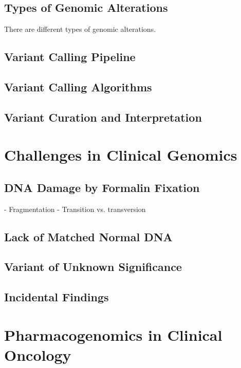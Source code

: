 \subsection{Types of Genomic Alterations}
There are different types of genomic alterations.

\subsection{Variant Calling Pipeline}

\subsection{Variant Calling Algorithms}

\subsection{Variant Curation and Interpretation}

\section{Challenges in Clinical Genomics}
\label{sec:ChallengesinClinicalGenomics}

\subsection{DNA Damage by Formalin Fixation}
- Fragmentation
- Transition vs. transversion

\subsection{Lack of Matched Normal DNA}

\subsection{Variant of Unknown Significance}

\subsection{Incidental Findings}

\section{Pharmacogenomics in Clinical Oncology}
\label{sec:PharmacogenomicsinClinicalOncology}

